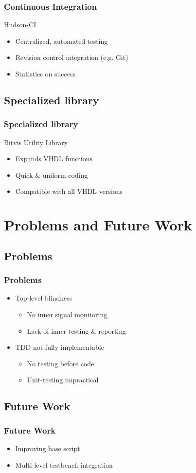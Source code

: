 \documentclass[british,10pt]{beamer}
\begin{document}
\begin{frame}\frametitle{Continuous Integration}
Hudson-CI
\begin{itemize}
\item Centralized, automated testing
\item Revision control integration (e.g. Git)
\item Statistics on success
\end{itemize}
\end{frame}

\subsection{Specialized library}

\begin{frame}\frametitle{Specialized library}
Bitvis Utility Library
\begin{itemize}
\item Expands VHDL functions
\item Quick \& uniform coding
\item Compatible with all VHDL versions
\end{itemize}
\end{frame}

\section{Problems and Future Work}

\subsection{Problems}
\begin{frame}\frametitle{Problems}
\begin{itemize}
\item Top-level blindness
\begin{itemize}
\item No inner signal monitoring
\item Lack of inner testing \& reporting
\end{itemize}
\item TDD not fully implementable
\begin{itemize}
\item No testing before code
\item Unit-testing impractical
\end{itemize}
\end{itemize}
\end{frame}

\subsection{Future Work}

\begin{frame}\frametitle{Future Work}
\begin{itemize}
\item Improving base script
\item Multi-level testbench integration
\end{itemize}
\end{frame}
\end{document}
